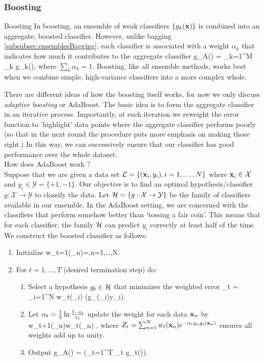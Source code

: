 \subsubsection{Boosting}
\label{subsubsec:ensemblesBoosting}
 \begin{mybox}{Boosting}
 	In boosting, an ensemble of weak classifiers $\{g_k(\mathbf{x})\}$ is combined into an aggregate, boosted classifier. However, unlike bagging \ref{subsubsec:ensemblesBagging}, each classifier is associated with a weight $\alpha_k$ that indicates how much it contributes to the aggregate classifier
 	\be 
 	\label{eq:ensemblesBoostingAggregateClassifier}
 	g_A(\mx) = \sum_{k=1}^M \alpha_k g_k(\mx),
 	\ee 
 	where $\sum_k \alpha_k =1$. Boosting, like all ensemble methods, works best when we combine simple, high-variance classifiers into a more complex whole.
 \end{mybox}
There are different ideas of how the boosting itself works, for now we only discuss \emph{adaptive boosting} or AdaBoost. The basic idea is to form the aggregate classifier in an iterative process. Importantly, at each iteration we reweight the error function to ’highlight’ data points where the aggregate classifier performs poorly (so that in the next round the procedure puts more emphasis on making those right.) In this way, we can successively ensure that our classifier has good performance over the whole dataset.\\
How does AdaBoost work ?\\
Suppose that we are given a data set $\mathcal{L}=\{(\mathbf{x}_i,y_i),i=1,\dots,N\}$ where $\mathbf{x}_i \in \mathcal{X}$ and $y_i\in\mathcal{Y}=\{+1,-1\}$. Our objective is to find an optimal hypothesis/classifier $g:\mathcal{X}\rightarrow \mathcal{Y}$ to classify the data. Let $\mathcal{H}=\{g:\mathcal{X}\rightarrow \mathcal{Y}\}$ be the family of classifiers available in our ensemble. In the AdaBoost setting, we are concerned with the classifiers that perform somehow better than ’tossing a fair coin’. This means that for each classifier, the family $\mathcal{H}$ can predict $y_i$ correctly at least half of the time.\\
We construct the boosted classifier as follows:
\begin{enumerate}
	\item Initialize
	\bse 
	w_{t=1}(\mx_n)=,\quad n=1,\dots,N.
	\ese 
	\item For $t=1,\dots, T$ (desired termination step) do:
	\begin{enumerate}
		\item Select a hypothesis $g_t \in \mathcal{H}$ that minimizes the weighted error 
		\be
		\epsilon_t = \sum_{i=1}^N w_t(\mx_i) \mI(g_(\mx_i)\neq y_i).
		\ee 
		\item Let $\alpha_t = \frac{1}{2} \ln \frac{1-\epsilon_t}{\epsilon_t}$ update the weight for each data $\mathbf{x}_n$ by 
		\bse 
		w_{t+1}(\mx_n)\leftarrow w_t(\mx_n) ,
		\ese 
		where $Z_t=\sum_{n=1}^N w_t(\mathbf{x}_n) e^{-\alpha_t y_n g_t(\mathbf{x}_n)}$ ensures all weights add up to unity.
		\item Output
	\bse 
	g_A(\mx) = \left(\sum_{t=1}^T \alpha_t g_t(\mx)\right).
	\ese 
	\end{enumerate}
\end{enumerate}
